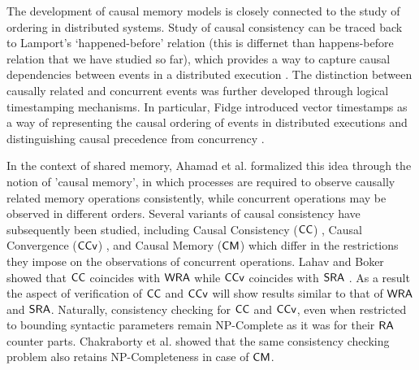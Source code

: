 \label{chap:cc-models}

The development of causal memory models is closely connected to the study of ordering in distributed systems. Study of causal consistency can be traced back to Lamport's `happened-before' relation (this is differnet than happens-before relation that we have studied so far), which provides a way to capture causal dependencies between events in a distributed execution \cite{SC-Lamport78}. The distinction between causally related and concurrent events was further developed through logical timestamping mechanisms. In particular, Fidge introduced vector timestamps as a way of representing the causal ordering of events in distributed executions and distinguishing causal precedence from concurrency \cite{Fidge1988}. %

In the context of shared memory, Ahamad et al. \cite{Ahamad1995} formalized this idea through the notion of 'causal memory', in which processes are required to observe causally related memory operations consistently, while concurrent operations may be observed in different orders.
Several variants of causal consistency have subsequently been studied\cite{BouajjaniEGH17}, including Causal Consistency ($\mathsf{CC}$) \cite{DBLP:conf/icdcs/HuttoA90}, Causal Convergence ($\mathsf{CCv}$) \cite{Burckhardt:2014}\cite{DBLP:journals/corr/PerrinMJ16}, and Causal Memory ($\mathsf{CM}$)\cite{Ahamad1995}\cite{DBLP:journals/corr/PerrinMJ16} which differ in the restrictions they impose on the observations of concurrent operations. Lahav and Boker showed that $\mathsf{CC}$ coincides with $\mathsf{WRA}$ while $\mathsf{CCv}$ coincides with $\mathsf{SRA}$  \cite{Lahav2021}. As a result the aspect of verification of $\mathsf{CC}$ and $\mathsf{CCv}$ will show results similar to that of $\mathsf{WRA}$ and $\mathsf{SRA}$. Naturally,  consistency checking for $\mathsf{CC}$ and $\mathsf{CCv}$, even when restricted to bounding syntactic parameters remain NP-Complete as it was for their $\mathsf{RA}$ counter parts.  Chakraborty et al.    \cite{ChakrabortyKMP24} showed that the same consistency checking problem also retains NP-Completeness in case of $\mathsf{CM}$. 

